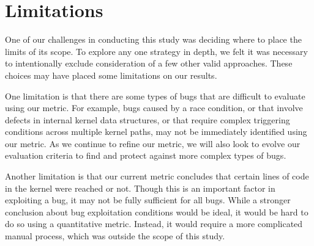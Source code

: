 \section{Limitations}
\label{sec.limitation}

One of our challenges in conducting this study was deciding where to place the
limits of its scope. To explore any one strategy
in depth, we felt it was necessary to intentionally exclude consideration of
a few other valid approaches. These choices may have placed some limitations on our results.

One limitation is that there are some types of bugs that are difficult to evaluate using our metric.
For example, bugs caused by a race condition, or that involve defects in internal kernel data
structures, or that require complex triggering conditions across multiple kernel
paths, may not be immediately identified using our metric. As we continue to refine our metric,
we will also look to evolve our evaluation criteria to find and protect against more complex types of bugs.

Another limitation is that our current metric concludes that certain lines of
code in the kernel were reached or not.
Though this is an important factor in exploiting a bug, it may not be fully
sufficient for all bugs.
While a stronger conclusion about bug exploitation conditions would be ideal,
it would be hard to do so using a quantitative metric.
Instead, it would require a more complicated manual process, which was outside
the scope of this study.
